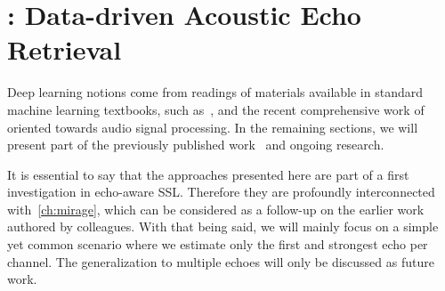 \chapter{: Data-driven Acoustic Echo Retrieval}\label{ch:lantern}

  \synopsisChLantern

\mynewline
Deep learning notions come from readings of materials available in standard machine learning textbooks, such as~, and the recent comprehensive work of~ oriented towards audio signal processing.
In the remaining sections, we will present part of the previously published work~\cite{di2019mirage} and ongoing research.

\mynewline
It is essential to say that the approaches presented here are part of a first investigation in echo-aware \ac{SSL}.
Therefore they are profoundly interconnected with~\cref{ch:mirage}, which can be considered as a follow-up on the earlier work~ authored by colleagues.
With that being said, we will mainly focus on a simple yet common scenario where we estimate only the first and strongest echo per channel.
The generalization to multiple echoes will only be discussed as future work.

